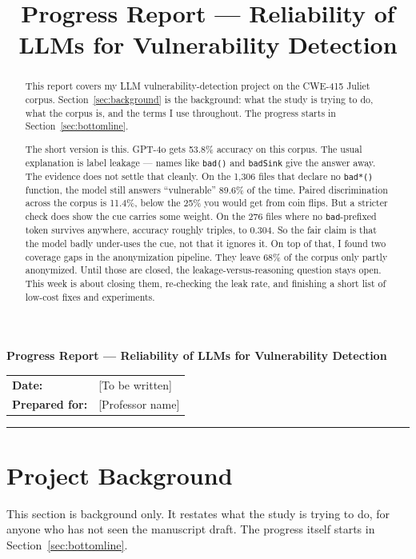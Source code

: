 \documentclass[11pt]{article}
\title{Progress Report --- Reliability of LLMs for Vulnerability Detection}
\author{}
\date{}
\begin{document}
\begin{center}
{\LARGE \textbf{Progress Report --- Reliability of LLMs for Vulnerability Detection}}\\[1em]
\begin{tabular}{ll}
\textbf{Date:} & [To be written] \\
\textbf{Prepared for:} & [Professor name] \\
\end{tabular}
\end{center}

\vspace{1em}
\hrule
\vspace{1em}

\begin{abstract}
\noindent This report covers my LLM vulnerability-detection project on the CWE-415 Juliet corpus.
Section~\ref{sec:background} is the background: what the study is trying to do, what the corpus
is, and the terms I use throughout. The progress starts in Section~\ref{sec:bottomline}.

\noindent The short version is this. GPT-4o gets 53.8\% accuracy on this corpus. The usual
explanation is label leakage --- names like \texttt{bad()} and \texttt{badSink} give the answer
away. The evidence does not settle that cleanly. On the 1,306 files that declare no
\texttt{bad*()} function, the model still answers ``vulnerable'' 89.6\% of the time. Paired
discrimination across the corpus is 11.4\%, below the 25\% you would get from coin flips. But a
stricter check does show the cue carries some weight. On the 276 files where no
\texttt{bad}-prefixed token survives anywhere, accuracy roughly triples, to 0.304. So the fair
claim is that the model badly under-uses the cue, not that it ignores it. On top of that, I found
two coverage gaps in the anonymization pipeline. They leave 68\% of the corpus only partly
anonymized. Until those are closed, the leakage-versus-reasoning question stays open. This week
is about closing them, re-checking the leak rate, and finishing a short list of low-cost fixes
and experiments.
\end{abstract}

\vspace{0.5em}

\section{Project Background}
\label{sec:background}

This section is background only. It restates what the study is trying to do, for anyone who has
not seen the manuscript draft. The progress itself starts in Section~\ref{sec:bottomline}.
\end{document}
